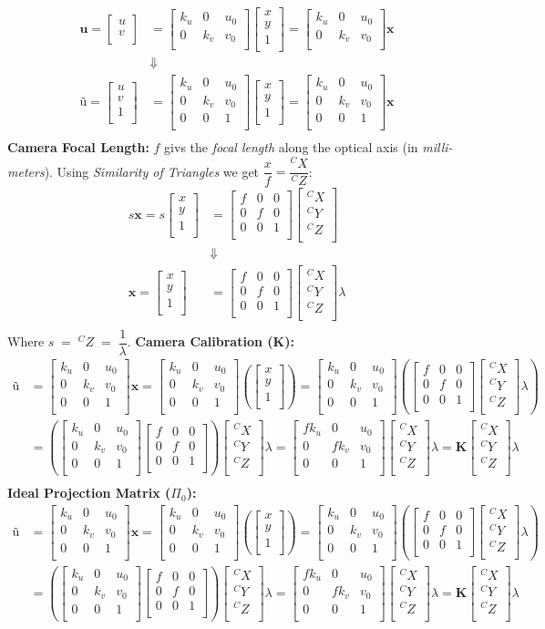 \documentclass[a4paper,10pt]{article}
\newcommand{\sNHu}{\ensuremath{\textbf{u}}}
\newcommand{\sHu}{\ensuremath{\textbf{\~{u}}}}
\newcommand{\sHx}{\ensuremath{\textbf{\~{x}}}}
\newcommand{\sNHK}{\ensuremath{\textbf{K}}}
\newcommand{\vNHuv}{\ensuremath{\left[\begin{array}{c}u\\v\\\end{array}\right]}}
\newcommand{\vHuv}{\ensuremath{\left[\begin{array}{c}u\\v\\1\\\end{array}\right]}}
\newcommand{\vHxy}{\ensuremath{\left[\begin{array}{c}x\\y\\1\\\end{array}\right]}}
\newcommand{\mNHkuv}{\ensuremath{\left[\begin{array}{ccc}k_u & 0 & u_0\\0 & k_v & v_0\\\end{array}\right]}}
\newcommand{\mHkuv}{\ensuremath{\left[\begin{array}{ccc}k_u & 0 & u_0\\0 & k_v & v_0\\ 0 & 0 & 1\\\end{array}\right]}}
\newcommand{\mNHf}{\ensuremath{\left[\begin{array}{ccc}f & 0 & 0\\0 & f & 0\\0 & 0 & 1\\\end{array}\right]}}
\newcommand{\vNHcx}{\ensuremath{\left[\begin{array}{c}^CX\\^CY\\^CZ\\\end{array}\right]}}
\newcommand{\mHfkuv}{\ensuremath{\left[\begin{array}{ccc}fk_u & 0 & u_0\\0 & fk_v & v_0\\ 0 & 0 & 1\\\end{array}\right]}}
\begin{document}
\begin{equation}
\begin{split}
\sNHu = \vNHuv &= \mNHkuv\vHxy = \mNHkuv\sHx\\
& \Downarrow 
\\
\sHu = \vHuv &= \mHkuv\vHxy = \mHkuv\sHx\\
\end{split}
\end{equation}
\newline\noindent\newline\noindent
\textbf{Camera Focal Length:}
\newline\noindent\newline\noindent
$f$ givs the \textit{focal length} along the optical axis (in \textit{milli-meters}).
\newline\noindent\newline\noindent
Using \emph{Similarity of Triangles} we get $\dfrac{x}{f} = \dfrac{^CX}{^CZ}$: 
\begin{equation}
\begin{split}
s\sHx = s\vHxy &= \mNHf\vNHcx \\
& \Downarrow \\
\sHx = \vHxy &= \mNHf\vNHcx\lambda \\
\end{split}
\end{equation}
Where $s\;=\;^CZ\;=\;\dfrac{1}{\lambda}$.
\newpage\noindent
\textbf{Camera Calibration ($\sNHK$):}
\newline\noindent\newline\noindent
\begin{equation}
\begin{split}
\sHu &= \mHkuv\sHx = \mHkuv\left(\vHxy\right)=\mHkuv\left(\mNHf\vNHcx\lambda\right)\\
&=\left(\mHkuv\mNHf\right)\vNHcx\lambda=\mHfkuv\vNHcx\lambda=\sNHK\vNHcx\lambda\\\
\end{split}
\end{equation}
\newline\noindent\newline\noindent
\textbf{Ideal Projection Matrix ($\Pi_0$):}
\newline\noindent\newline\noindent
\begin{equation}
\begin{split}
\sHu &= \mHkuv\sHx = \mHkuv\left(\vHxy\right)=\mHkuv\left(\mNHf\vNHcx\lambda\right)\\
&=\left(\mHkuv\mNHf\right)\vNHcx\lambda=\mHfkuv\vNHcx\lambda=\sNHK\vNHcx\lambda\\\
\end{split}
\end{equation}
\end{document}
